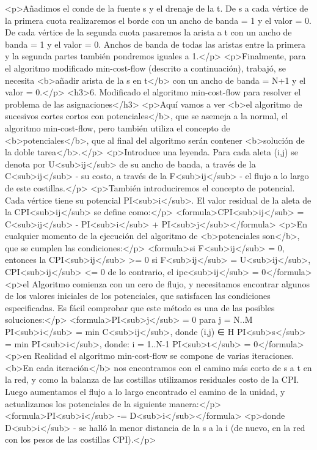 <p>Añadimos el conde de la fuente s y el drenaje de la t. De s a cada vértice de la primera cuota realizaremos el borde con un ancho de banda = 1 y el valor = 0. De cada vértice de la segunda cuota pasaremos la arista a t con un ancho de banda = 1 y el valor = 0. Anchos de banda de todas las aristas entre la primera y la segunda partes también pondremos iguales a 1.</p>
<p>Finalmente, para el algoritmo modificado min-cost-flow (descrito a continuación), trabajó, se necesita <b>añadir arista de la s en t</b> con un ancho de banda = N+1 y el valor = 0.</p>
<h3>6. Modificado el algoritmo min-cost-flow para resolver el problema de las asignaciones</h3>
<p>Aquí vamos a ver <b>el algoritmo de sucesivos cortes cortos con potenciales</b>, que se asemeja a la normal, el algoritmo min-cost-flow, pero también utiliza el concepto de <b>potenciales</b>, que al final del algoritmo serán contener <b>solución de la doble tarea</b>.</p>
<p>Introduce una leyenda. Para cada aleta (i,j) se denota por U<sub>ij</sub> de su ancho de banda, a través de la C<sub>ij</sub> - su costo, a través de la F<sub>ij</sub> - el flujo a lo largo de este costillas.</p>
<p>También introduciremos el concepto de potencial. Cada vértice tiene su potencial PI<sub>i</sub>. El valor residual de la aleta de la CPI<sub>ij</sub> se define como:</p>
<formula>CPI<sub>ij</sub> = C<sub>ij</sub> - PI<sub>i</sub> + PI<sub>j</sub></formula>
<p>En cualquier momento de la ejecución del algoritmo de <b>potenciales son</b>, que se cumplen las condiciones:</p>
<formula>si F<sub>ij</sub> = 0, entonces la CPI<sub>ij</sub> >= 0
si F<sub>ij</sub> = U<sub>ij</sub>, CPI<sub>ij</sub> <= 0
de lo contrario, el ipc<sub>ij</sub> = 0</formula>
<p>el Algoritmo comienza con un cero de flujo, y necesitamos encontrar algunos de los valores iniciales de los potenciales, que satisfacen las condiciones especificadas. Es fácil comprobar que este método es una de las posibles soluciones:</p>
<formula>PI<sub>j</sub> = 0 para j = N..M
PI<sub>i</sub> = min C<sub>ij</sub>, donde (i,j) ∈ H
PI<sub>s</sub> = min PI<sub>i</sub>, donde: i = 1..N-1
PI<sub>t</sub> = 0</formula>
<p>en Realidad el algoritmo min-cost-flow se compone de varias iteraciones. <b>En cada iteración</b> nos encontramos con el camino más corto de s a t en la red, y como la balanza de las costillas utilizamos residuales costo de la CPI. Luego aumentamos el flujo a lo largo encontrado el camino de la unidad, y actualizamos los potenciales de la siguiente manera:</p>
<formula>PI<sub>i</sub> -= D<sub>i</sub></formula>
<p>donde D<sub>i</sub> - se halló la menor distancia de la s a la i (de nuevo, en la red con los pesos de las costillas CPI).</p>

